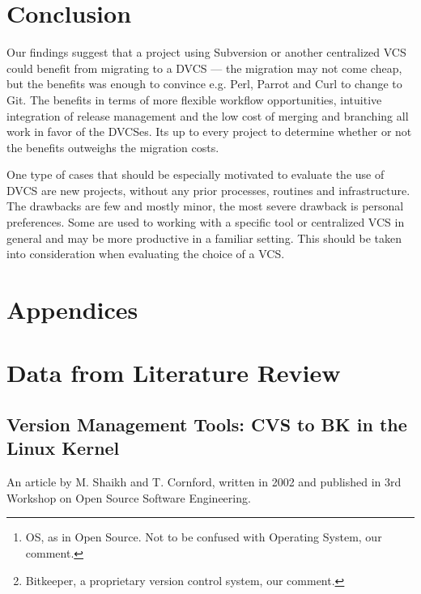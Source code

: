 \documentclass{llncs}
\begin{document}
\section{Conclusion}

Our findings suggest that a project using Subversion or another
centralized VCS could benefit from migrating to a DVCS --- the
migration may not come cheap, but the benefits was enough to convince
e.g. Perl, Parrot and Curl to change to Git. The benefits in terms of
more flexible workflow opportunities, intuitive integration of release
management and the low cost of merging and branching all work in favor
of the DVCSes. Its up to every project to determine whether or not the
benefits outweighs the migration costs.

One type of cases that should be especially motivated to evaluate the
use of DVCS are new projects, without any prior processes, routines
and infrastructure. The drawbacks are few and mostly minor, the most
severe drawback is personal preferences. Some are used to working with
a specific tool or centralized VCS in general and may be more
productive in a familiar setting. This should be taken into
consideration when evaluating the choice of a VCS.

 


\newpage
\section*{Appendices}
\appendix
\section{Data from Literature Review}
\subsection{Version Management Tools: CVS to BK in the Linux Kernel}

An article by M. Shaikh and T. Cornford, written in 2002 and published 
in 3rd Workshop on Open Source Software Engineering.

\begin{abstract}
 Version management tools might be seen as a prerequisite for open
 source development today as projects become too large to be managed by
 maintainers alone. Yet the OS\footnote{ 
  OS, as in Open Source. Not to be confused with Operating System, our 
  comment.
 } process depends on fluid coordination and collaboration with the
 underlying qualities of this process based on firm trust and
 respect for fellow developers. This paper is a study of how
 debate over version tools reflects governance and decision making
 in an OS community. The paper is based on a study of the Linux kernel
 community as it first saw a partial acceptance of the CVS tool, and then
 later adopted BK\footnote{
  Bitkeeper, a proprietary version control system, our comment. 
 }. The paper explains the adoption process in relation to governance
 concerns, license issues, and questions of technical performance.
\end{abstract}
\end{document}
